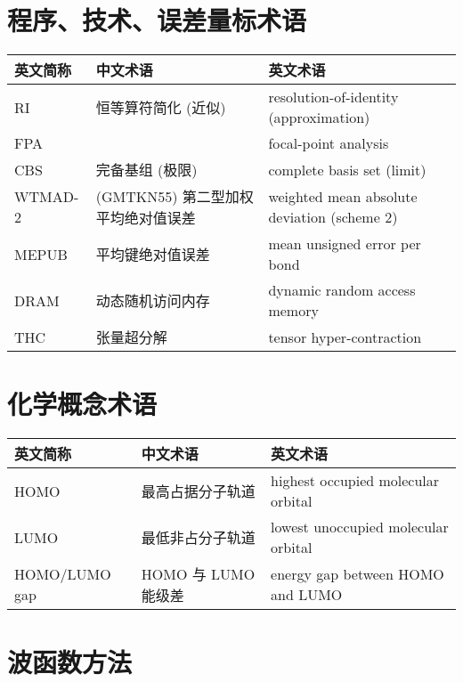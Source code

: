 \endgroup
    
\section*{程序、技术、误差量标术语}

\begingroup
\setlength{\LTleft}{-20cm plus -1fill}
\setlength{\LTright}{\LTleft}

\begin{longtable}{lll}
    \hline 英文简称 & 中文术语 & 英文术语 \\ \hline \endhead
    \hline \endfoot
    RI & 恒等算符简化 (近似) & resolution-of-identity (approximation) \\
    FPA & & focal-point analysis \\
    CBS & 完备基组 (极限) & complete basis set (limit) \\
    WTMAD-2 & (GMTKN55) 第二型加权平均绝对值误差 & weighted mean absolute deviation (scheme 2) \\
    MEPUB & 平均键绝对值误差 & mean unsigned error per bond \\
    DRAM & 动态随机访问内存 & dynamic random access memory \\
    THC & 张量超分解 & tensor hyper-contraction \\
\end{longtable}

\endgroup
    
\section*{化学概念术语}

\begingroup
\setlength{\LTleft}{-20cm plus -1fill}
\setlength{\LTright}{\LTleft}

\begin{longtable}{lll}
    \hline 英文简称 & 中文术语 & 英文术语 \\ \hline \endhead
    \hline \endfoot
    HOMO & 最高占据分子轨道 & highest occupied molecular orbital \\
    LUMO & 最低非占分子轨道 & lowest unoccupied molecular orbital \\
    HOMO/LUMO gap & HOMO 与 LUMO 能级差 & energy gap between HOMO and LUMO \\
\end{longtable}

\endgroup

\section*{波函数方法}


